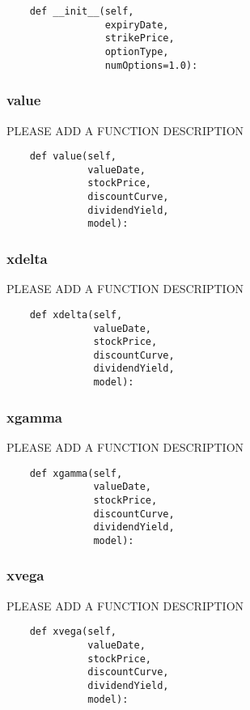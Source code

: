 \documentclass[twoside,11pt]{book}
\begin{document}
\begin{lstlisting}
    def __init__(self,
                 expiryDate,
                 strikePrice,
                 optionType,
                 numOptions=1.0):
\end{lstlisting}

\subsubsection*{{\bf value}}
PLEASE ADD A FUNCTION DESCRIPTION

\begin{lstlisting}
    def value(self,
              valueDate,
              stockPrice,
              discountCurve,
              dividendYield,
              model):
\end{lstlisting}

\subsubsection*{{\bf xdelta}}
PLEASE ADD A FUNCTION DESCRIPTION

\begin{lstlisting}
    def xdelta(self,
               valueDate,
               stockPrice,
               discountCurve,
               dividendYield,
               model):
\end{lstlisting}

\subsubsection*{{\bf xgamma}}
PLEASE ADD A FUNCTION DESCRIPTION

\begin{lstlisting}
    def xgamma(self,
               valueDate,
               stockPrice,
               discountCurve,
               dividendYield,
               model):
\end{lstlisting}

\subsubsection*{{\bf xvega}}
PLEASE ADD A FUNCTION DESCRIPTION

\begin{lstlisting}
    def xvega(self,
              valueDate,
              stockPrice,
              discountCurve,
              dividendYield,
              model):
\end{lstlisting}
\end{document}
